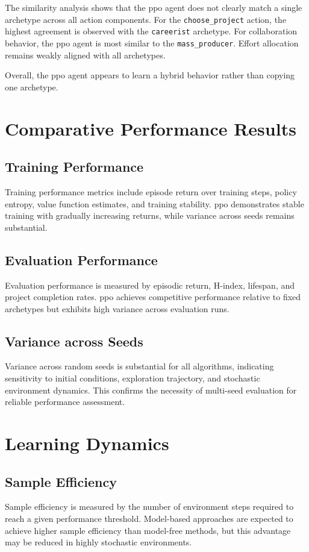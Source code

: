 \documentclass[english,bachelor]{hsluthesis}
\begin{document}
The similarity analysis shows that the \gls{ppo} agent does not clearly match a single archetype across all action components. For the \texttt{choose\_project} action, the highest agreement is observed with the \texttt{careerist} archetype. For collaboration behavior, the \gls{ppo} agent is most similar to the \texttt{mass\_producer}. Effort allocation remains weakly aligned with all archetypes.

Overall, the \gls{ppo} agent appears to learn a hybrid behavior rather than copying one archetype.

\section{Comparative Performance Results}

\subsection{Training Performance}
Training performance metrics include episode return over training steps, policy entropy, value function estimates, and training stability. \gls{ppo} demonstrates stable training with gradually increasing returns, while variance across seeds remains substantial.

\subsection{Evaluation Performance}
Evaluation performance is measured by episodic return, H-index, lifespan, and project completion rates. \gls{ppo} achieves competitive performance relative to fixed archetypes but exhibits high variance across evaluation runs.

\subsection{Variance across Seeds}
Variance across random seeds is substantial for all algorithms, indicating sensitivity to initial conditions, exploration trajectory, and stochastic environment dynamics. This confirms the necessity of multi-seed evaluation for reliable performance assessment.

\section{Learning Dynamics}

\subsection{Sample Efficiency}
Sample efficiency is measured by the number of environment steps required to reach a given performance threshold. Model-based approaches are expected to achieve higher sample efficiency than model-free methods, but this advantage may be reduced in highly stochastic environments.
\end{document}

